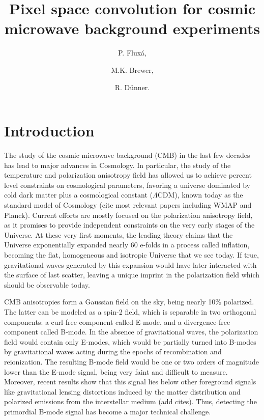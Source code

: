 \documentclass[a4paper,11pt]{article}
\title{\boldmath Pixel space convolution for cosmic microwave background experiments}
\author[a]{P. Flux\'a, }
\author[b]{M.K. Brewer, }
\author[a]{R. D\"unner.}
\affiliation[a]{Instituto de Astrof\'isica, Pontificia Universidad Cat\'olica de Chile ,\\Vicu\~na Mackenna 4860, Chile}
\affiliation[b]{Department of Astronomy, Johns Hopkins University,\\Baltimore MD, USA}
\begin{document}
\maketitle
\flushbottom


\section{Introduction}

\showthe\textwidth

The study of the cosmic microwave background (CMB) in the last few decades has lead to major advances in Cosmology. In particular, the study of the temperature and polarization anisotropy field has allowed us to achieve percent level constraints on cosmological parameters, favoring a universe dominated by cold dark matter plus a cosmological constant ($\Lambda$CDM), known today as the standard model of Cosmology {\color{red} (cite most relevant papers including WMAP and Planck)}. Current efforts are mostly focused on the polarization anisotropy field, as it promises to provide independent constraints on the very early stages of the Universe. At these very first moments, the leading theory claims that the Universe exponentially expanded nearly 60 e-folds in a process called inflation, becoming the flat, homogeneous and isotropic Universe that we see today. If true, gravitational waves generated by this expansion would have later interacted with the surface of last scatter, leaving a unique imprint in the polarization field which should be observable today.

CMB anisotropies form a Gaussian field on the sky, being nearly 10\% polarized. The latter can be modeled as a spin-2 field, which is separable in two orthogonal components: a curl-free component called E-mode, and a divergence-free component called B-mode. In the absence of gravitational waves, the polarization field would contain only E-modes, which would be partially turned into B-modes by gravitational waves acting during the epochs of recombination and reionization. The resulting B-mode field would be one or two orders of magnitude lower than the E-mode signal, being very faint and difficult to measure. Moreover, recent results show that this signal lies below other foreground signals like gravitational lensing distortions induced by the matter distribution and polarized emissions from the interstellar medium {\color{red}(add cites)}. Thus, detecting the primordial B-mode signal has become a major technical challenge.
\end{document}
